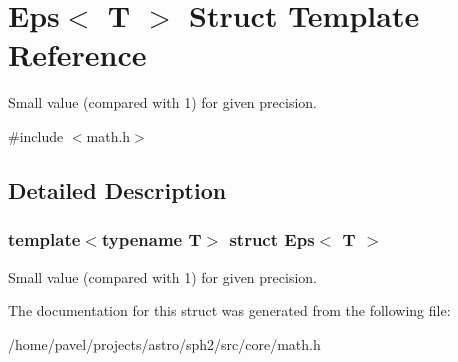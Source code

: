 \hypertarget{structEps}{}\section{Eps$<$ T $>$ Struct Template Reference}
\label{structEps}


Small value (compared with 1) for given precision.  




{\ttfamily \#include $<$math.\+h$>$}



\subsection{Detailed Description}
\subsubsection*{template$<$typename T$>$\newline
struct Eps$<$ T $>$}

Small value (compared with 1) for given precision. 

The documentation for this struct was generated from the following file\+:\begin{DoxyCompactItemize}
\item 
/home/pavel/projects/astro/sph2/src/core/math.\+h\end{DoxyCompactItemize}
